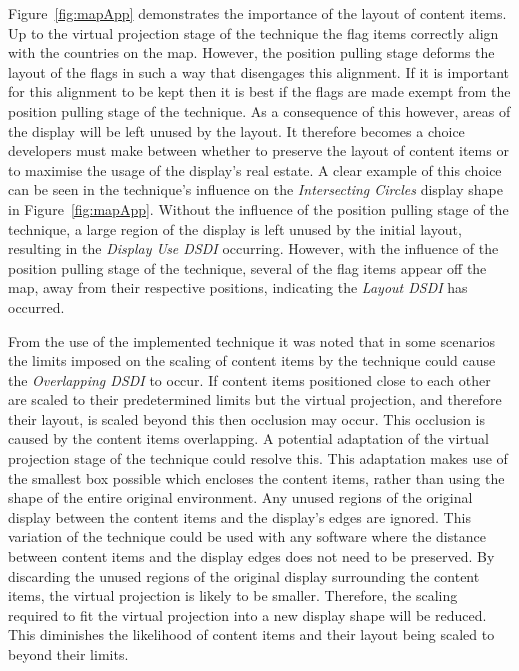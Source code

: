 \documentclass{bmcart}
\begin{document}
Figure~\ref{fig:mapApp} demonstrates the importance of the layout of content items.
Up to the virtual projection stage of the technique the flag items correctly align with the countries on the map.
However, the position pulling stage deforms the layout of the flags in such a way that disengages this alignment.
If it is important for this alignment to be kept then it is best if the flags are made exempt from the position pulling stage of the technique.
As a consequence of this however, areas of the display will be left unused by the layout.
It therefore becomes a choice developers must make between whether to preserve the layout of content items or to maximise the usage of the display's real estate.
A clear example of this choice can be seen in the technique's influence on the {\emph{Intersecting Circles}} display shape in Figure~\ref{fig:mapApp}.
Without the influence of the position pulling stage of the technique, a large region of the display is left unused by the initial layout, resulting in the {\emph{Display Use \ac{DSDI}}} occurring.
However, with the influence of the position pulling stage of the technique, several of the flag items appear off the map, away from their respective positions, indicating the {\emph{Layout \ac{DSDI}}} has occurred.

From the use of the implemented technique it was noted that in some scenarios the limits imposed on the scaling of content items by the technique could cause the {\emph{Overlapping \ac{DSDI}}} to occur.
If content items positioned close to each other are scaled to their predetermined limits but the virtual projection, and therefore their layout, is scaled beyond this then occlusion may occur.
This occlusion is caused by the content items overlapping.
A potential adaptation of the virtual projection stage of the technique could resolve this.  
This adaptation makes use of the smallest box possible which encloses the content items, rather than using the shape of the entire original environment.
Any unused regions of the original display between the content items and the display's edges are ignored.
This variation of the technique could be used with any software where the distance between content items and the display edges does not need to be preserved.
By discarding the unused regions of the original display surrounding the content items, the virtual projection is likely to be smaller.
Therefore, the scaling required to fit the virtual projection into a new display shape will be reduced.
This diminishes the likelihood of content items and their layout being scaled to beyond their limits. 
\end{document}
